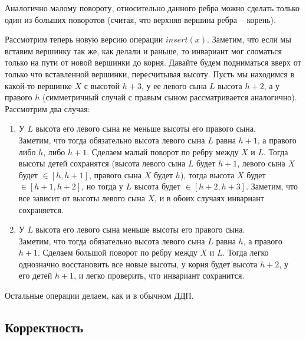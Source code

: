 \begin{note}
    Аналогично малому повороту, относительно данного ребра можно сделать только один из больших поворотов (считая, что верхняя вершина ребра -- корень).
\end{note}

Рассмотрим теперь новую версию операции $insert(x)$. Заметим, что если мы вставим вершинку так же, как делали и раньше, то инвариант мог сломаться только на пути от новой вершинки до корня. Давайте будем подниматься вверх от только что вставленной вершинки, пересчитывая высоту. Пусть мы находимся в какой-то вершинке $X$ с высотой $h + 3$, у ее левого сына $L$ высота $h + 2$, а у правого $h$ (симметричный случай с правым сыном рассматривается аналогично). Рассмотрим два случая:
\begin{enumerate}
    \item У $L$ высота его левого сына не меньше высоты его правого сына. \\
    Заметим, что тогда обязательно высота левого сына $L$ равна $h+1$, а правого либо $h$, либо $h+1$. Сделаем малый поворот по ребру между $X$ и $L$. Тогда высоты детей сохранятся (высота левого сына $L$ будет $h+1$, левого сына $X$ будет $\in [h, h+1]$, правого сына $X$ будет $h$), тогда высота $X$ будет $\in [h+1, h+2]$, но тогда у $L$ высота будет $\in [h+2, h+3]$. Заметим, что все зависит от высоты левого сына $X$, и в обоих случаях инвариант сохраняется.
    \item У $L$ высота его левого сына меньше высоты его правого сына. \\
    Заметим, что тогда обязательно высота левого сына $L$ равна $h$, а правого $h+1$. Сделаем большой поворот по ребру между $X$ и $L$. Тогда легко однозначно восстановить все новые высоты, у корня будет высота $h+2$, у его детей $h+1$, и легко проверить, что инвариант сохранится.
\end{enumerate}

Остальные операции делаем, как и в обычном ДДП.



\subsection{Корректность}



